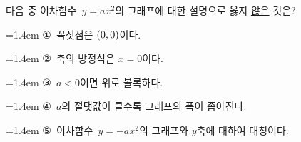 다음 중 이차함수~$y=ax^2$의 그래프에 대한 설명으로 옳지 \underline{않은} 것은?
\par\medskip\par\noindent\hangindent=1.4em {\small ①}\ 꼭짓점은 $(0{,}\mkern3mu 0)$이다.\par\noindent\hangindent=1.4em {\small ②}\ 축의 방정식은 $x=0$이다.\par\noindent\hangindent=1.4em {\small ③}\ $a<0$이면 위로 볼록하다.\par\noindent\hangindent=1.4em {\small ④}\ $a$의 절댓값이 클수록 그래프의 폭이 좁아진다.\par\noindent\hangindent=1.4em {\small ⑤}\ 이차함수~$y=-ax^2$의 그래프와 $y$축에 대하여 대칭이다.\par\medskip
